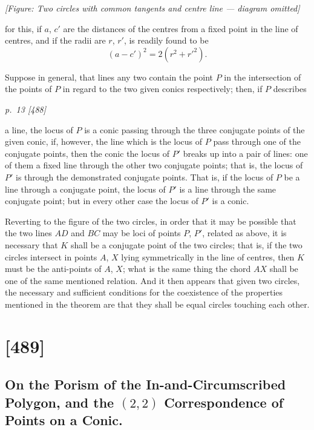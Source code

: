 \documentclass[11pt,a4paper]{article}
\theoremstyle{plain}
\theoremstyle{definition}
\begin{document}
\begin{center}
\textit{[Figure: Two circles with common tangents and centre line --- diagram omitted]}
\end{center}

for this, if $a$, $c'$ are the distances of the centres from a fixed point in the line of
centres, and if the radii are $r$, $r'$, is readily found to be
\[
(a - c')^2 = 2 (r^2 + r'^2).
\]

Suppose in general, that lines any two contain the point $P$ in the intersection
of the points of $P$ in regard to the two given conics respectively; then, if $P$ describes

\clearpage

\bigskip
\textit{p.~13 [488]}
\smallskip

\noindent
a line, the locus of $P$ is a conic passing through the three conjugate points of the
given conic, if, however, the line which is the locus of $P$ pass through one of the
conjugate points, then the conic the locus of $P'$ breaks up into a pair of lines: one of
them a fixed line through the other two conjugate points; that is, the locus of $P'$ is
through the demonstrated conjugate points.  That is, if the locus of $P$ be a line
through a conjugate point, the locus of $P'$ is a line through the same conjugate
point; but in every other case the locus of $P'$ is a conic.

Reverting to the figure of the two circles, in order that it may be possible that
the two lines $AD$ and $BC$ may be loci of points $P$, $P'$, related as above, it is necessary
that $K$ shall be a conjugate point of the two circles; that is, if the two circles intersect in points $A$, $X$ lying symmetrically in the line of centres, then $K$ must be the
anti-points of $A$, $X$; what is the same thing the chord $AX$ shall be one of the same
mentioned relation.  And it then appears that given two circles, the necessary and
sufficient conditions for the coexistence of the properties mentioned in the theorem are
that they shall be equal circles touching each other.

\clearpage

\section{[489]}
\subsection{On the Porism of the In-and-Circumscribed Polygon, and the $(2,2)$ Correspondence of Points on a Conic.}
\end{document}
